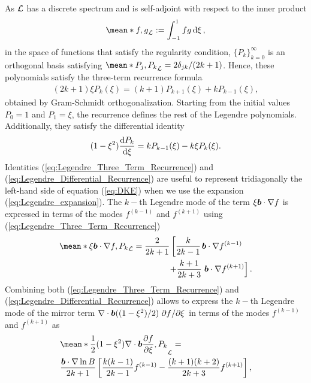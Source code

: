 As $\mathcal{L}$ has a discrete spectrum and is self-adjoint with respect to the inner product
%
\begin{align}
	\mean*{f,g}_\Lorentz := \int_{-1}^{1} fg \dd{\xi} ,
\end{align}
in the space of functions that satisfy the regularity condition, $\{P_k\}_{k=0}^{\infty}$ is an orthogonal basis satisfying $\mean*{P_j,P_k}_\Lorentz = 2 \delta_{jk}/(2k+1)$. Hence, these polynomials satisfy the three-term recurrence formula
%
\begin{align}
	(2k+1)\xi P_k(\xi) = (k+1)P_{k+1}(\xi) + k P_{k-1}(\xi),
	\label{eq:Legendre_Three_Term_Recurrence}
\end{align}
obtained by Gram-Schmidt orthogonalization. Starting from the initial values $P_0=1$ and $P_1=\xi$, the recurrence defines the rest of the Legendre polynomials. Additionally, they satisfy the differential identity
%
\begin{align}
	(1-\xi^2)\dv{P_k}{\xi} = k P_{k-1}(\xi) - k \xi P_k(\xi).
	\label{eq:Legendre_Differential_Recurrence}
\end{align}
%
Identities (\ref{eq:Legendre_Three_Term_Recurrence}) and (\ref{eq:Legendre_Differential_Recurrence}) are useful to represent tridiagonally the left-hand side of equation (\ref{eq:DKE}) when we use the expansion (\ref{eq:Legendre_expansion}). The $k-$th Legendre mode of the term $\xi\vb*{b}\cdot \nabla f $ is expressed in terms of the modes $f^{(k-1)}$ and $f^{(k+1)}$ using (\ref{eq:Legendre_Three_Term_Recurrence})
\begin{align}	
	\mean*{\xi \vb*{b}\cdot\nabla f, P_k}_\Lorentz
	=
	\frac{2}{2k+1}
	\left[
	\frac{k}{2k-1} 
	\right.
	& \vb*{b}\cdot\nabla f^{(k-1)} \nonumber
	  \\+
	\frac{k+1}{2k+3} 
	& 
	\left.\vb*{b}\cdot\nabla f^{(k+1)} 
	\right].
\end{align}
 Combining both (\ref{eq:Legendre_Three_Term_Recurrence}) and (\ref{eq:Legendre_Differential_Recurrence}) allows to express the $k-$th Legendre mode of the mirror term $\nabla\cdot \vb*{b}((1-\xi^2)/2)\pdv*{f}{\xi}$ in terms of the modes $f^{(k-1)}$ and $f^{(k+1)}$ as
 \begin{align} 	
 	& \mean*{ 
 		\frac{1}{2}(1-\xi^2)
 		\nabla\cdot\vb*{b}  
 		\pdv{f}{\xi}, P_k}_\Lorentz
 	=	\\
 	&\frac{\vb*{b}\cdot\nabla \ln B}{2k+1}
 	\left[
 	\frac{k(k-1)}{2k-1} 
 	f^{(k-1)} 
 	-
 	\frac{(k+1)(k+2)}{2k+3}
 	f^{(k+1)} 
 	\right], \nonumber
 \end{align}
